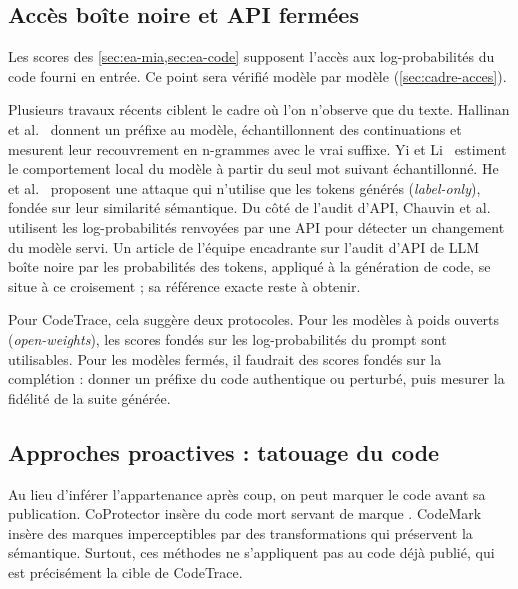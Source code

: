 	\subsection{Accès boîte noire et API fermées}\label{sec:ea-boite-noire}
		Les scores des \cref{sec:ea-mia,sec:ea-code} supposent l'accès aux log-probabilités du code fourni en entrée.  Ce point sera vérifié modèle par modèle (\cref{sec:cadre-acces}).

		Plusieurs travaux récents ciblent le cadre où l'on n'observe que du texte. Hallinan et al.~\cite{hallinan2025} donnent un préfixe au modèle, échantillonnent des continuations et mesurent leur recouvrement en n-grammes avec le vrai suffixe. Yi et Li~\cite{yi2026} estiment le comportement local du modèle à partir du seul mot suivant échantillonné. He et al.~\cite{he2025} proposent une attaque qui n'utilise que les tokens générés (\emph{label-only}), fondée sur leur similarité sémantique. Du côté de l'audit d'API, Chauvin et al.~\cite{chauvin2025} utilisent les log-probabilités renvoyées par une API pour détecter un changement du modèle servi. Un article de l'équipe encadrante sur l'audit d'API de LLM boîte noire par les probabilités des tokens, appliqué à la génération de code, se situe à ce croisement ; sa référence exacte reste à obtenir.

		Pour CodeTrace, cela suggère deux protocoles. Pour les modèles à poids ouverts (\emph{open-weights}), les scores fondés sur les log-probabilités du prompt sont utilisables. Pour les modèles fermés, il faudrait des scores fondés sur la complétion : donner un préfixe du code authentique ou perturbé, puis mesurer la fidélité de la suite générée.

	\subsection{Approches proactives : tatouage du code}\label{sec:ea-tatouage}
		Au lieu d'inférer l'appartenance après coup, on peut marquer le code avant sa publication. CoProtector insère du code mort servant de marque . CodeMark~\cite{sun2023} insère des marques imperceptibles par des transformations qui préservent la sémantique.  Surtout, ces méthodes ne s'appliquent pas au code déjà publié, qui est précisément la cible de CodeTrace.

